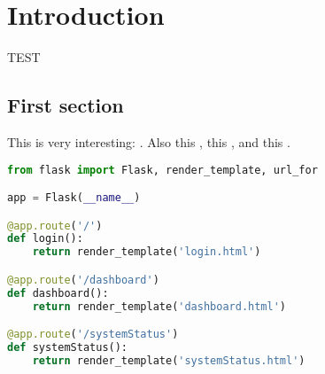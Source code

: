 \chapter{Introduction}

TEST

\section{First section}

This is very interesting: \cite{coulouris}. Also this \cite{donoho}, this \cite{ictbusiness}, and this \cite{dalal}.

\begin{code}[Implementation]
    \begin{lstlisting}[language=Python]
from flask import Flask, render_template, url_for

app = Flask(__name__)

@app.route('/')
def login():
    return render_template('login.html')

@app.route('/dashboard')
def dashboard():
    return render_template('dashboard.html')

@app.route('/systemStatus')
def systemStatus():
    return render_template('systemStatus.html')
    \end{lstlisting}
\end{code}